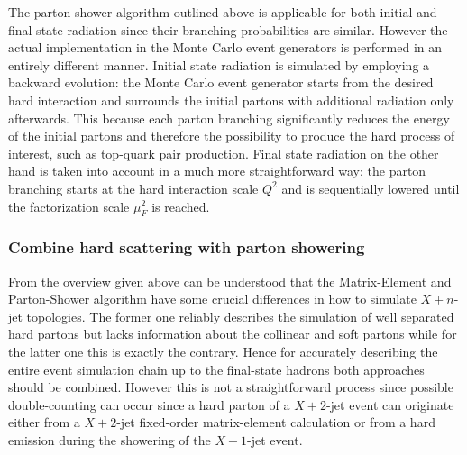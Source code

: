 The parton shower algorithm outlined above is applicable for both initial and final state radiation since their branching probabilities are similar. However the actual implementation in the Monte Carlo event generators is performed in an entirely different manner. 
Initial state radiation is simulated by employing a backward evolution: the Monte Carlo event generator starts from the desired hard interaction and surrounds the initial partons with additional radiation only afterwards. This because each parton branching significantly reduces the energy of the initial partons and therefore the possibility to produce the hard process of interest, such as top-quark pair production. 
Final state radiation on the other hand is taken into account in a much more straightforward way: the parton branching starts at the hard interaction scale $Q^{2}$ and is sequentially lowered until the factorization scale $\mu_{F}^{2}$ is reached.

\subsubsection{Combine hard scattering with parton showering}
From the overview given above can be understood that the Matrix-Element and Parton-Shower algorithm have some crucial differences in how to simulate $X+n$-jet topologies.
The former one reliably describes the simulation of well separated hard partons but lacks information about the collinear and soft partons while for the latter one this is exactly the contrary. Hence for accurately describing the entire event simulation chain up to the final-state hadrons both approaches should be combined. However this is not a straightforward process since possible double-counting can occur since a hard parton of a $X+2$-jet event can originate either from a $X+2$-jet fixed-order matrix-element calculation or from a hard emission during the showering of the $X+1$-jet event.
\\

